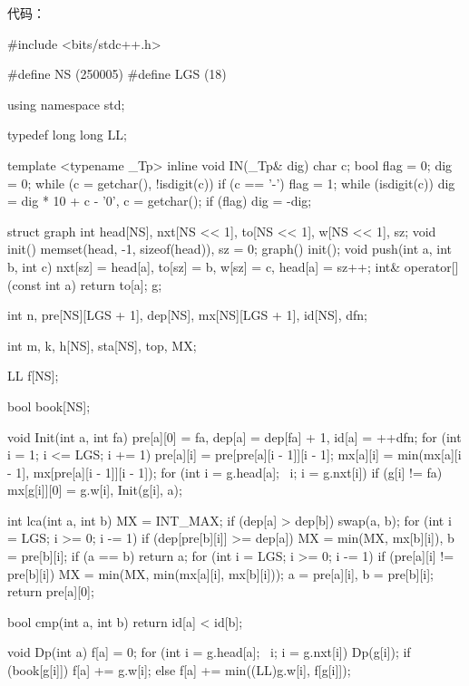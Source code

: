 {代码：

\begin{cppcode}
#include <bits/stdc++.h>

#define NS (250005)
#define LGS (18)

using namespace std;

typedef long long LL;

template <typename _Tp>
inline void IN(_Tp& dig) {
  char c;
  bool flag = 0;
  dig = 0;
  while (c = getchar(), !isdigit(c))
    if (c == '-') flag = 1;
  while (isdigit(c)) dig = dig * 10 + c - '0', c = getchar();
  if (flag) dig = -dig;
}

struct graph {
  int head[NS], nxt[NS << 1], to[NS << 1], w[NS << 1], sz;
  void init() { memset(head, -1, sizeof(head)), sz = 0; }
  graph() { init(); }
  void push(int a, int b, int c) {
    nxt[sz] = head[a], to[sz] = b, w[sz] = c, head[a] = sz++;
  }
  int& operator[](const int a) { return to[a]; }
} g;

int n, pre[NS][LGS + 1], dep[NS], mx[NS][LGS + 1], id[NS], dfn;

int m, k, h[NS], sta[NS], top, MX;

LL f[NS];

bool book[NS];

void Init(int a, int fa) {
  pre[a][0] = fa, dep[a] = dep[fa] + 1, id[a] = ++dfn;
  for (int i = 1; i <= LGS; i += 1) {
    pre[a][i] = pre[pre[a][i - 1]][i - 1];
    mx[a][i] = min(mx[a][i - 1], mx[pre[a][i - 1]][i - 1]);
  }
  for (int i = g.head[a]; ~i; i = g.nxt[i])
    if (g[i] != fa) mx[g[i]][0] = g.w[i], Init(g[i], a);
}

int lca(int a, int b) {
  MX = INT_MAX;
  if (dep[a] > dep[b]) swap(a, b);
  for (int i = LGS; i >= 0; i -= 1)
    if (dep[pre[b][i]] >= dep[a]) MX = min(MX, mx[b][i]), b = pre[b][i];
  if (a == b) return a;
  for (int i = LGS; i >= 0; i -= 1)
    if (pre[a][i] != pre[b][i]) {
      MX = min(MX, min(mx[a][i], mx[b][i]));
      a = pre[a][i], b = pre[b][i];
    }
  return pre[a][0];
}

bool cmp(int a, int b) { return id[a] < id[b]; }

void Dp(int a) {
  f[a] = 0;
  for (int i = g.head[a]; ~i; i = g.nxt[i]) {
    Dp(g[i]);
    if (book[g[i]])
      f[a] += g.w[i];
    else
      f[a] += min((LL)g.w[i], f[g[i]]);
  }
}


\end{cppcode}}
